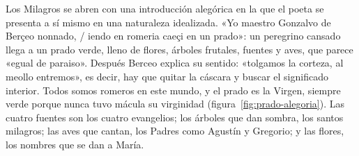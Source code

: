 \documentclass{book}
\begin{document}
Los Milagros se abren con una introducción alegórica en la que el poeta se presenta a sí mismo en una naturaleza idealizada. «Yo maestro Gonzalvo de Berçeo nonnado, / iendo en romeria caeçi en un prado»: un peregrino cansado llega a un prado verde, lleno de flores, árboles frutales, fuentes y aves, que parece «egual de paraiso». Después Berceo explica su sentido: «tolgamos la corteza, al meollo entremos», es decir, hay que quitar la cáscara y buscar el significado interior. Todos somos romeros en este mundo, y el prado es la Virgen, siempre verde porque nunca tuvo mácula su virginidad (figura~\ref{fig:prado-alegoria}). Las cuatro fuentes son los cuatro evangelios; los árboles que dan sombra, los santos milagros; las aves que cantan, los Padres como Agustín y Gregorio; y las flores, los nombres que se dan a María.

\end{document}
